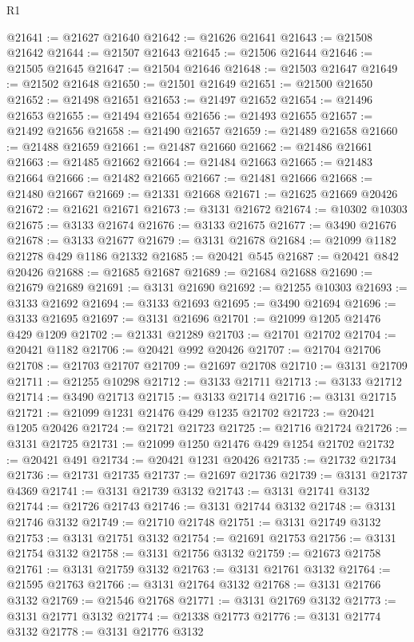 \begin{lexlean}{R1}
\begin{coremodule}
@21641 := @21627 @21640
@21642 := @21626 @21641
@21643 := @21508 @21642
@21644 := @21507 @21643
@21645 := @21506 @21644
@21646 := @21505 @21645
@21647 := @21504 @21646
@21648 := @21503 @21647
@21649 := @21502 @21648
@21650 := @21501 @21649
@21651 := @21500 @21650
@21652 := @21498 @21651
@21653 := @21497 @21652
@21654 := @21496 @21653
@21655 := @21494 @21654
@21656 := @21493 @21655
@21657 := @21492 @21656
@21658 := @21490 @21657
@21659 := @21489 @21658
@21660 := @21488 @21659
@21661 := @21487 @21660
@21662 := @21486 @21661
@21663 := @21485 @21662
@21664 := @21484 @21663
@21665 := @21483 @21664
@21666 := @21482 @21665
@21667 := @21481 @21666
@21668 := @21480 @21667
@21669 := @21331 @21668
@21671 := @21625 @21669 @20426
@21672 := @21621 @21671
@21673 := @3131 @21672
@21674 := @10302 @10303
@21675 := @3133 @21674
@21676 := @3133 @21675
@21677 := @3490 @21676
@21678 := @3133 @21677
@21679 := @3131 @21678
@21684 := @21099 @1182 @21278 @429 @1186 @21332
@21685 := @20421 @545
@21687 := @20421 @842 @20426
@21688 := @21685 @21687
@21689 := @21684 @21688
@21690 := @21679 @21689
@21691 := @3131 @21690
@21692 := @21255 @10303
@21693 := @3133 @21692
@21694 := @3133 @21693
@21695 := @3490 @21694
@21696 := @3133 @21695
@21697 := @3131 @21696
@21701 := @21099 @1205 @21476 @429 @1209
@21702 := @21331 @21289
@21703 := @21701 @21702
@21704 := @20421 @1182
@21706 := @20421 @992 @20426
@21707 := @21704 @21706
@21708 := @21703 @21707
@21709 := @21697 @21708
@21710 := @3131 @21709
@21711 := @21255 @10298
@21712 := @3133 @21711
@21713 := @3133 @21712
@21714 := @3490 @21713
@21715 := @3133 @21714
@21716 := @3131 @21715
@21721 := @21099 @1231 @21476 @429 @1235 @21702
@21723 := @20421 @1205 @20426
@21724 := @21721 @21723
@21725 := @21716 @21724
@21726 := @3131 @21725
@21731 := @21099 @1250 @21476 @429 @1254 @21702
@21732 := @20421 @491
@21734 := @20421 @1231 @20426
@21735 := @21732 @21734
@21736 := @21731 @21735
@21737 := @21697 @21736
@21739 := @3131 @21737 @4369
@21741 := @3131 @21739 @3132
@21743 := @3131 @21741 @3132
@21744 := @21726 @21743
@21746 := @3131 @21744 @3132
@21748 := @3131 @21746 @3132
@21749 := @21710 @21748
@21751 := @3131 @21749 @3132
@21753 := @3131 @21751 @3132
@21754 := @21691 @21753
@21756 := @3131 @21754 @3132
@21758 := @3131 @21756 @3132
@21759 := @21673 @21758
@21761 := @3131 @21759 @3132
@21763 := @3131 @21761 @3132
@21764 := @21595 @21763
@21766 := @3131 @21764 @3132
@21768 := @3131 @21766 @3132
@21769 := @21546 @21768
@21771 := @3131 @21769 @3132
@21773 := @3131 @21771 @3132
@21774 := @21338 @21773
@21776 := @3131 @21774 @3132
@21778 := @3131 @21776 @3132

\end{coremodule}
\end{lexlean}
